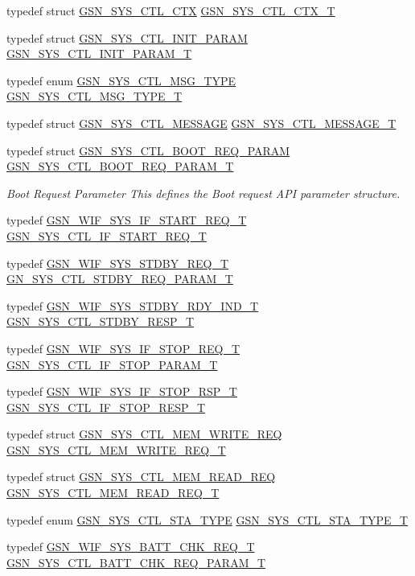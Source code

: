 \begin{DoxyCompactItemize}
typedef struct \hyperlink{a00248}{GSN\_\-SYS\_\-CTL\_\-CTX} \hyperlink{a00592_ae5427b57fe0c68bea517ad9805c3dc12}{GSN\_\-SYS\_\-CTL\_\-CTX\_\-T}
\item 
typedef struct \hyperlink{a00249}{GSN\_\-SYS\_\-CTL\_\-INIT\_\-PARAM} \hyperlink{a00592_a677f8625d8ec9414fdd26fa76aad585e}{GSN\_\-SYS\_\-CTL\_\-INIT\_\-PARAM\_\-T}
\item 
typedef enum \hyperlink{a00592_a9db34a7470eae0600850f44d6d4101bb}{GSN\_\-SYS\_\-CTL\_\-MSG\_\-TYPE} \hyperlink{a00592_a178e119be14397a7bc5fdd415b454dac}{GSN\_\-SYS\_\-CTL\_\-MSG\_\-TYPE\_\-T}
\item 
typedef struct \hyperlink{a00252}{GSN\_\-SYS\_\-CTL\_\-MESSAGE} \hyperlink{a00592_ae713524f000e16863094cf95d735914f}{GSN\_\-SYS\_\-CTL\_\-MESSAGE\_\-T}
\item 
typedef struct \hyperlink{a00247}{GSN\_\-SYS\_\-CTL\_\-BOOT\_\-REQ\_\-PARAM} \hyperlink{a00636_ga131a12dab3ad56372462964539832fe9}{GSN\_\-SYS\_\-CTL\_\-BOOT\_\-REQ\_\-PARAM\_\-T}
\begin{DoxyCompactList}\small\item\em Boot Request Parameter This defines the Boot request API parameter structure. \end{DoxyCompactList}\item 
typedef \hyperlink{a00353}{GSN\_\-WIF\_\-SYS\_\-IF\_\-START\_\-REQ\_\-T} \hyperlink{a00592_a427912d3a0518a0ca30f465b0bcfc5e4}{GSN\_\-SYS\_\-CTL\_\-IF\_\-START\_\-REQ\_\-T}
\item 
typedef \hyperlink{a00364}{GSN\_\-WIF\_\-SYS\_\-STDBY\_\-REQ\_\-T} \hyperlink{a00592_a2541026eb876a1b97821d653e78471e8}{GN\_\-SYS\_\-CTL\_\-STDBY\_\-REQ\_\-PARAM\_\-T}
\item 
typedef \hyperlink{a00363}{GSN\_\-WIF\_\-SYS\_\-STDBY\_\-RDY\_\-IND\_\-T} \hyperlink{a00592_aa812bcee0c0382527fcbd265786f8ef6}{GSN\_\-SYS\_\-CTL\_\-STDBY\_\-RESP\_\-T}
\item 
typedef \hyperlink{a00355}{GSN\_\-WIF\_\-SYS\_\-IF\_\-STOP\_\-REQ\_\-T} \hyperlink{a00592_adcf17c85777d6d4edf413488e71f24ba}{GSN\_\-SYS\_\-CTL\_\-IF\_\-STOP\_\-PARAM\_\-T}
\item 
typedef \hyperlink{a00356}{GSN\_\-WIF\_\-SYS\_\-IF\_\-STOP\_\-RSP\_\-T} \hyperlink{a00592_a212275de1752c444a66d9210d799b9f1}{GSN\_\-SYS\_\-CTL\_\-IF\_\-STOP\_\-RESP\_\-T}
\item 
typedef struct \hyperlink{a00251}{GSN\_\-SYS\_\-CTL\_\-MEM\_\-WRITE\_\-REQ} \hyperlink{a00592_aef1d0416b4b74a50b15c89f09a0e7775}{GSN\_\-SYS\_\-CTL\_\-MEM\_\-WRITE\_\-REQ\_\-T}
\item 
typedef struct \hyperlink{a00250}{GSN\_\-SYS\_\-CTL\_\-MEM\_\-READ\_\-REQ} \hyperlink{a00592_af1174be8fab88c0f84e040d984f886cb}{GSN\_\-SYS\_\-CTL\_\-MEM\_\-READ\_\-REQ\_\-T}
\item 
typedef enum \hyperlink{a00592_a849d3be20e6f5d436ec1cbbede9ed181}{GSN\_\-SYS\_\-CTL\_\-STA\_\-TYPE} \hyperlink{a00592_ab00e389970e76c88cef321d6cf1559ec}{GSN\_\-SYS\_\-CTL\_\-STA\_\-TYPE\_\-T}
\item 
typedef \hyperlink{a00346}{GSN\_\-WIF\_\-SYS\_\-BATT\_\-CHK\_\-REQ\_\-T} \hyperlink{a00592_a8dd20442cad64b6670aa3c7de24c3e9d}{GSN\_\-SYS\_\-CTL\_\-BATT\_\-CHK\_\-REQ\_\-PARAM\_\-T}
\end{DoxyCompactItemize}

